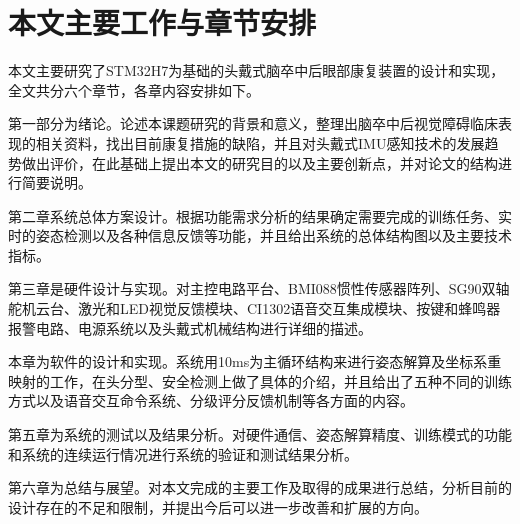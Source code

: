 \section{本文主要工作与章节安排}

本文主要研究了STM32H7为基础的头戴式脑卒中后眼部康复装置的设计和实现，全文共分六个章节，各章内容安排如下。

第一部分为绪论。论述本课题研究的背景和意义，整理出脑卒中后视觉障碍临床表现的相关资料，找出目前康复措施的缺陷，并且对头戴式IMU感知技术的发展趋势做出评价，在此基础上提出本文的研究目的以及主要创新点，并对论文的结构进行简要说明。

第二章系统总体方案设计。根据功能需求分析的结果确定需要完成的训练任务、实时的姿态检测以及各种信息反馈等功能，并且给出系统的总体结构图以及主要技术指标。

第三章是硬件设计与实现。对主控电路平台、BMI088惯性传感器阵列、SG90双轴舵机云台、激光和LED视觉反馈模块、CI1302语音交互集成模块、按键和蜂鸣器报警电路、电源系统以及头戴式机械结构进行详细的描述。

本章为软件的设计和实现。系统用10ms为主循环结构来进行姿态解算及坐标系重映射的工作，在头分型、安全检测上做了具体的介绍，并且给出了五种不同的训练方式以及语音交互命令系统、分级评分反馈机制等各方面的内容。

第五章为系统的测试以及结果分析。对硬件通信、姿态解算精度、训练模式的功能和系统的连续运行情况进行系统的验证和测试结果分析。

第六章为总结与展望。对本文完成的主要工作及取得的成果进行总结，分析目前的设计存在的不足和限制，并提出今后可以进一步改善和扩展的方向。